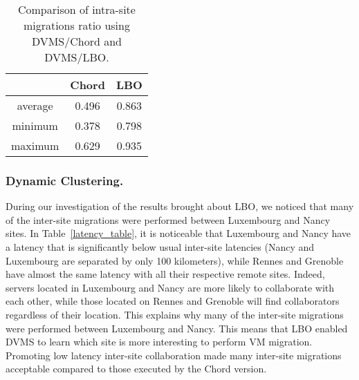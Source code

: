 \begin{table}

  \begin{center}
    \begin{tabular}{|c|c|c|}   

      \hline \multicolumn{1}{|p{3cm}|}{ }
       & \multicolumn{1}{|p{3cm}|}{\centering Chord }  & \multicolumn{1}{|p{3cm}|}{ \centering LBO}  \\

      \hline
      average & 0.496 & 0.863 \\

      \hline
      minimum & 0.378 & 0.798 \\

      \hline
      maximum & 0.629 & 0.935 \\

      \hline
    \end{tabular}
  \end{center}
  \caption{\label{migration_table} Comparison of intra-site migrations ratio
    using DVMS/Chord and DVMS/LBO.}
  \vspace{-0.3cm}
\end{table}


\subsubsection{Dynamic Clustering.}

During our investigation of the results brought about LBO, we noticed that many of the
inter-site migrations were performed between Luxembourg and Nancy sites.
In Table~\ref{latency_table}, it is noticeable that Luxembourg and Nancy have a latency that is significantly
below usual inter-site latencies (Nancy and Luxembourg are separated by only 100 kilometers),
while Rennes and Grenoble have almost the same latency with all their respective remote sites.
Indeed, servers located in Luxembourg and Nancy are more likely to collaborate with each other, while those located
on Rennes and Grenoble will find collaborators regardless of their location. This explains
why many of the inter-site migrations were performed between Luxembourg and Nancy.
This means that LBO enabled DVMS to learn which site is more interesting to perform VM
migration. Promoting low latency inter-site collaboration made many inter-site
migrations acceptable compared to those executed by the Chord version.


